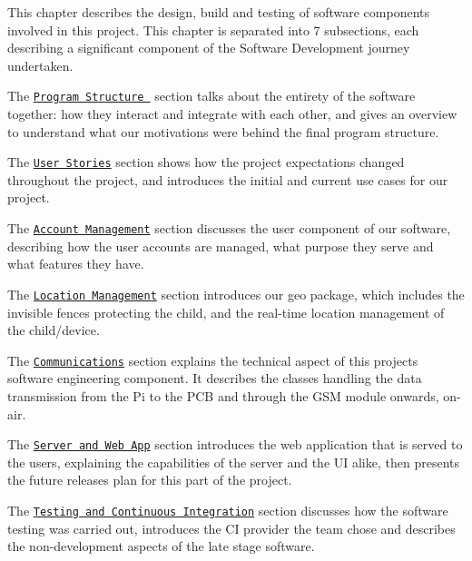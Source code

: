 This chapter describes the design, build and testing of software components involved in this project. This chapter is separated into 7 subsections, each describing a significant component of the Software Development journey undertaken.


\begin{DoxyItemize}
\item The \href{https://github.com/itsBelinda/ENG5220-2020-Team13/wiki/Program-Structure}{\tt Program Structure } section talks about the entirety of the software together\+: how they interact and integrate with each other, and gives an overview to understand what our motivations were behind the final program structure.
\item The \href{https://github.com/itsBelinda/ENG5220-2020-Team13/wiki/User-Stories}{\tt User Stories} section shows how the project expectations changed throughout the project, and introduces the initial and current use cases for our project.
\item The \href{https://github.com/itsBelinda/ENG5220-2020-Team13/wiki/Account-Management}{\tt Account Management} section discusses the user component of our software, describing how the user accounts are managed, what purpose they serve and what features they have.
\item The \href{https://github.com/itsBelinda/ENG5220-2020-Team13/wiki/Location-management}{\tt Location Management} section introduces our geo package, which includes the invisible fences protecting the child, and the real-\/time location management of the child/device.
\item The \href{https://github.com/itsBelinda/ENG5220-2020-Team13/wiki/Communications}{\tt Communications} section explains the technical aspect of this project\textquotesingle{}s software engineering component. It describes the classes handling the data transmission from the Pi to the P\+CB and through the G\+SM module onwards, on-\/air.
\item The \href{https://github.com/itsBelinda/ENG5220-2020-Team13/wiki/Server-and-Web-App}{\tt Server and Web App} section introduces the web application that is served to the users, explaining the capabilities of the server and the UI alike, then presents the future releases plan for this part of the project.
\item The \href{https://github.com/itsBelinda/ENG5220-2020-Team13/wiki/Testing-and-Continuous-Integration}{\tt Testing and Continuous Integration} section discusses how the software testing was carried out, introduces the CI provider the team chose and describes the non-\/development aspects of the late stage software. 
\end{DoxyItemize}
